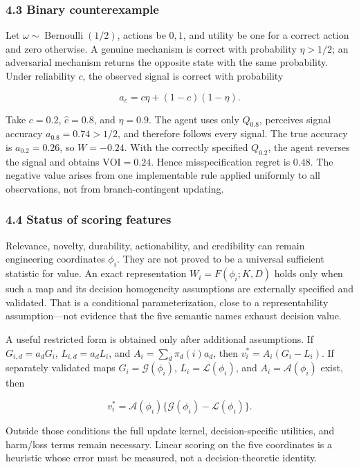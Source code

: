 \documentclass[
  11pt]{article}
\begin{document}
\subsubsection{4.3 Binary counterexample}\label{binary-counterexample}

Let \(\omega\sim\operatorname{Bernoulli}(1/2)\), actions be \(0,1\), and
utility be one for a correct action and zero otherwise. A genuine
mechanism is correct with probability \(\eta>1/2\); an adversarial
mechanism returns the opposite state with the same probability. Under
reliability \(c\), the observed signal is correct with probability

\[a_c=c\eta+(1-c)(1-\eta).\]

Take \(c=0.2\), \(\hat c=0.8\), and \(\eta=0.9\). The agent uses only
\(Q_{0.8}\), perceives signal accuracy \(a_{0.8}=0.74>1/2\), and
therefore follows every signal. The true accuracy is \(a_{0.2}=0.26\),
so \(W=-0.24\). With the correctly specified \(Q_{0.2}\), the agent
reverses the signal and obtains \(\mathrm{VOI}=0.24\). Hence
misspecification regret is \(0.48\). The negative value arises from one
implementable rule applied uniformly to all observations, not from
branch-contingent updating.

\subsubsection{4.4 Status of scoring
features}\label{status-of-scoring-features}

Relevance, novelty, durability, actionability, and credibility can
remain engineering coordinates \(\phi_i\). They are not proved to be a
universal sufficient statistic for value. An exact representation
\(W_i=F(\phi_i;K,D)\) holds only when such a map and its decision
homogeneity assumptions are externally specified and validated. That is
a conditional parameterization, close to a representability
assumption---not evidence that the five semantic names exhaust decision
value.

A useful restricted form is obtained only after additional assumptions.
If \(G_{i,d}=a_dG_i\), \(L_{i,d}=a_dL_i\), and
\(A_i=\sum_d\pi_d(i)a_d\), then \(v_i^*=A_i(G_i-L_i)\). If separately
validated maps \(G_i=\mathcal G(\phi_i)\), \(L_i=\mathcal L(\phi_i)\),
and \(A_i=\mathcal A(\phi_i)\) exist, then

\[v_i^*=\mathcal A(\phi_i)\{\mathcal G(\phi_i)-\mathcal L(\phi_i)\}.\]

Outside those conditions the full update kernel, decision-specific
utilities, and harm/loss terms remain necessary. Linear scoring on the
five coordinates is a heuristic whose error must be measured, not a
decision-theoretic identity.
\end{document}
